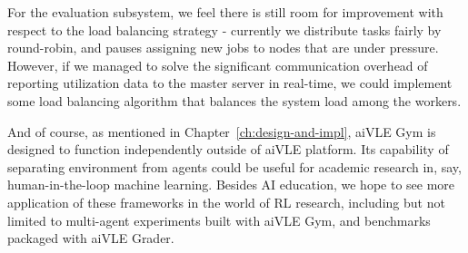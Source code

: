 For the evaluation subsystem, we feel there is still room for improvement with respect to the load balancing strategy - currently we distribute tasks fairly by round-robin, and pauses assigning new jobs to nodes that are under pressure. However, if we managed to solve the significant communication overhead of reporting utilization data to the master server in real-time, we could implement some load balancing algorithm that balances the system load among the workers.

And of course, as mentioned in Chapter~\ref{ch:design-and-impl}, aiVLE Gym is designed to function independently outside of aiVLE platform. Its capability of separating environment from agents could be useful for academic research in, say, human-in-the-loop machine learning. Besides AI education, we hope to see more application of these frameworks in the world of RL research, including but not limited to multi-agent experiments built with aiVLE Gym, and benchmarks packaged with aiVLE Grader.
